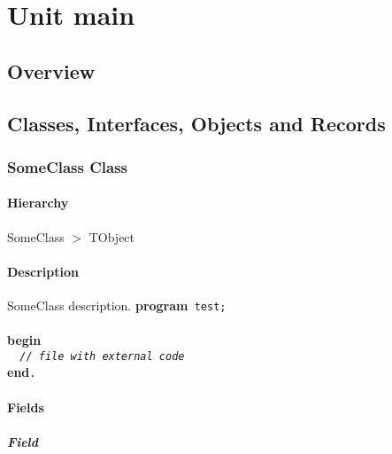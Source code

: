 \documentclass{report}
\begin{document}
\newlength{\tmplength}
\chapter{Unit main}
\section{Overview}
\begin{description}
\item[\texttt{\begin{ttfamily}SomeClass\end{ttfamily} Class}]
\end{description}
\section{Classes, Interfaces, Objects and Records}
\subsection*{SomeClass Class}
\subsubsection*{\large{\textbf{Hierarchy}}\normalsize\hspace{1ex}\hfill}
SomeClass {$>$} TObject
\subsubsection*{\large{\textbf{Description}}\normalsize\hspace{1ex}\hfill}
SomeClass description. \texttt{}\textbf{program}\texttt{~test;\\\nopagebreak[3]
\\\nopagebreak[3]
}\textbf{begin}\texttt{\\\nopagebreak[3]
~~\textit{//~file~with~external~code}\\\nopagebreak[3]
}\textbf{end}\texttt{.\\
}\subsubsection*{\large{\textbf{Fields}}\normalsize\hspace{1ex}\hfill}
\paragraph*{Field}\hspace*{\fill}
\end{document}
